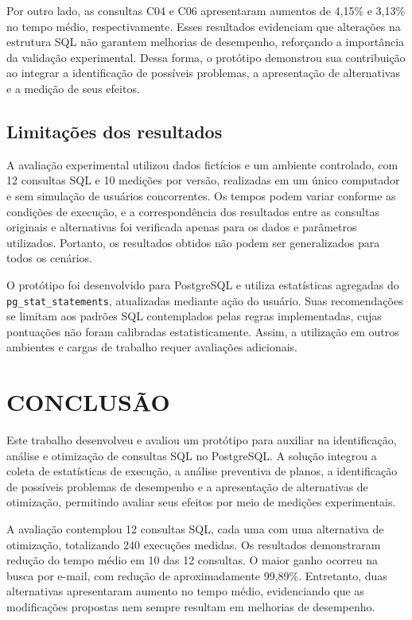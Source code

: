 \documentclass{UNESC}
\newcommand{\codigo}[1]{\texttt{#1}}
\begin{document}
Por outro lado, as consultas C04 e C06 apresentaram aumentos de 4,15\% e 3,13\% no tempo médio, respectivamente. Esses resultados evidenciam que alterações na estrutura SQL não garantem melhorias de desempenho, reforçando a importância da validação experimental. Dessa forma, o protótipo demonstrou sua contribuição ao integrar a identificação de possíveis problemas, a apresentação de alternativas e a medição de seus efeitos.

\subsection{Limitações dos resultados}

A avaliação experimental utilizou dados fictícios e um ambiente controlado, com 12 consultas SQL e 10 medições por versão, realizadas em um único computador e sem simulação de usuários concorrentes. Os tempos podem variar conforme as condições de execução, e a correspondência dos resultados entre as consultas originais e alternativas foi verificada apenas para os dados e parâmetros utilizados. Portanto, os resultados obtidos não podem ser generalizados para todos os cenários.

O protótipo foi desenvolvido para PostgreSQL e utiliza estatísticas agregadas do \codigo{pg\_stat\_statements}, atualizadas mediante ação do usuário. Suas recomendações se limitam aos padrões SQL contemplados pelas regras implementadas, cujas pontuações não foram calibradas estatisticamente. Assim, a utilização em outros ambientes e cargas de trabalho requer avaliações adicionais.




\section{CONCLUSÃO}

Este trabalho desenvolveu e avaliou um protótipo para auxiliar na identificação, análise e otimização de consultas SQL no PostgreSQL. A solução integrou a coleta de estatísticas de execução, a análise preventiva de planos, a identificação de possíveis problemas de desempenho e a apresentação de alternativas de otimização, permitindo avaliar seus efeitos por meio de medições experimentais.

A avaliação contemplou 12 consultas SQL, cada uma com uma alternativa de otimização, totalizando 240 execuções medidas. Os resultados demonstraram redução do tempo médio em 10 das 12 consultas. O maior ganho ocorreu na busca por e-mail, com redução de aproximadamente 99,89\%. Entretanto, duas alternativas apresentaram aumento no tempo médio, evidenciando que as modificações propostas nem sempre resultam em melhorias de desempenho.
\end{document}
